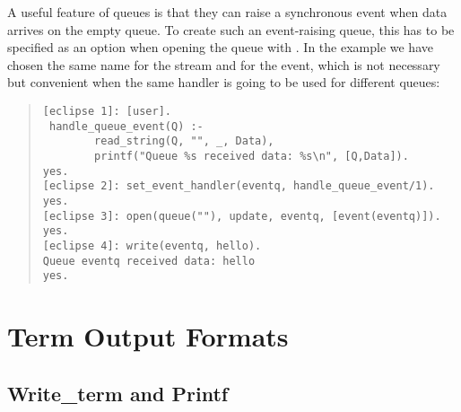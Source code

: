 A useful feature of queues is that they can raise a synchronous event
when data arrives on the empty queue. To create such an event-raising
queue, this has to be specified as an option when opening the queue with
.
In the example we have chosen the same name for the stream and for the
event, which is not necessary but convenient when the same handler
is going to be used for different queues:
\begin{quote}\begin{verbatim}
[eclipse 1]: [user].
 handle_queue_event(Q) :-  
        read_string(Q, "", _, Data),
        printf("Queue %s received data: %s\n", [Q,Data]).
yes.
[eclipse 2]: set_event_handler(eventq, handle_queue_event/1).
yes.
[eclipse 3]: open(queue(""), update, eventq, [event(eventq)]).
yes.
[eclipse 4]: write(eventq, hello).
Queue eventq received data: hello
yes.
\end{verbatim}\end{quote} 


\section{Term Output Formats}
\label{secoutputformats}

\subsection{Write_term and Printf}

